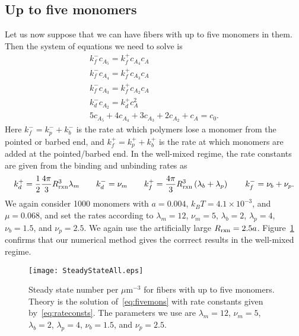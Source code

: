 \documentclass[11pt]{article}
\newcommand{\C}[1]{c_{#1}}
\begin{document}
\subsection{Up to five monomers}
Let us now suppose that we can have fibers with up to five monomers in them. Then the system of equations we need to solve is \cite{edelstein1998models}
\begin{subequations}
\label{eq:fivemons}
\begin{gather}
k_f^-  \C{A_5} = k_f^+ \C{A_4} \C{A}\\
k_f^-  \C{A_4} = k_f^+ \C{A_3} \C{A}\\
k_f^-  \C{A_3} = k_f^+ \C{A_2} \C{A}\\
k_d^- \C{A_2} = k_d^+ \C{A}^2 \\
5\C{A_5}+4\C{A_4}+3\C{A_3}+2\C{A_2}+\C{A} = \C{0}. 
\end{gather}
\end{subequations}
Here $k_f^-=k_p^-+k_b^-$ is the rate at which polymers lose a monomer from the pointed or barbed end, and $k_f^+=k_p^++k_b^+$ is the rate at which monomers are added at the pointed/barbed end. In the well-mixed regime, the rate constants are given from the binding and unbinding rates as
\begin{equation}
\label{eq:rateconsts}
k_d^+ = \frac{1}{2}\frac{4 \pi}{3} R_\text{rxn}^3 \lambda_m \qquad k_d^- = \nu_m \qquad k_f^+ = \frac{4 \pi}{3} R_\text{rxn}^3 \left(\lambda_b+\lambda_p\right) \qquad k_f^- = \nu_b+\nu_p.
\end{equation}
We again consider 1000 monomers with $a=0.004$, $k_B T = 4.1 \times 10^{-3}$, and $\mu=0.068$, and set the rates according to $\lambda_m=12$, $\nu_m=5$, $\lambda_b=2$, $\lambda_p=4$, $\nu_b=1.5$, and $\nu_p=2.5$. We again use the artificially large $R_\text{rxn} = 2.5a$. Figure\ \ref{fig:ManyMons} confirms that our numerical method gives the corrrect results in the well-mixed regime. 


\begin{figure}
\centering
\texttt{[image: SteadyStateAll.eps]}
\caption{\label{fig:ManyMons}Steady state number per $\mu$m$^{-3}$ for fibers with up to five monomers. Theory is the solution of\ \eqref{eq:fivemons} with rate constants given by\ \eqref{eq:rateconsts}. The parameters we use are $\lambda_m=12$, $\nu_m=5$, $\lambda_b=2$, $\lambda_p=4$, $\nu_b=1.5$, and $\nu_p=2.5$.}
\end{figure}
\end{document}
